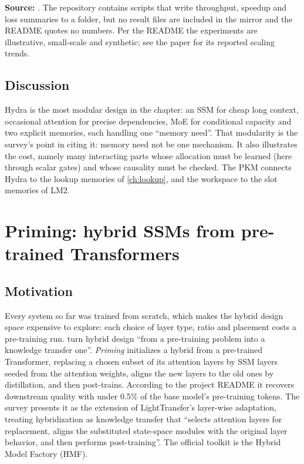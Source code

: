 \begin{results}
\textbf{Source:} . The repository contains scripts
that write throughput, speedup and loss summaries to a  folder, but no result files
are included in the mirror and the README quotes no numbers. Per the README the experiments are
illustrative, small-scale and synthetic; see the paper for its reported scaling trends.
\end{results}

\subsection{Discussion}

Hydra is the most modular design in the chapter: an SSM for cheap long context, occasional
attention for precise dependencies, MoE for conditional capacity and two explicit memories, each
handling one ``memory need''. That modularity is the survey's point in citing it: memory need not be
one mechanism. It also illustrates the cost, namely many interacting parts whose allocation must be
learned (here through scalar gates) and whose causality must be checked. The PKM connects Hydra to
the lookup memories of \cref{ch:lookup}, and the workspace to the slot memories of LM2.
\section{Priming: hybrid SSMs from pre-trained Transformers}\label{sec:c12-priming}

\subsection{Motivation}

Every system so far was trained from scratch, which makes the hybrid design space expensive to
explore: each choice of layer type, ratio and placement costs a pre-training run.
\citet{chattopadhyay2026priming} turn hybrid design ``from a pre-training problem into a
knowledge transfer one''. \emph{Priming} initializes a hybrid from a pre-trained Transformer,
replacing a chosen subset of its attention layers by SSM layers seeded from the attention weights,
aligns the new layers to the old ones by distillation, and then post-trains. According to the
project README it recovers downstream quality with under 0.5\% of the base model's pre-training
tokens. The survey presents it as the extension of LightTransfer's layer-wise adaptation, treating
hybridization as knowledge transfer that ``selects attention layers for replacement, aligns the
substituted state-space modules with the original layer behavior, and then performs
post-training''. The official toolkit is the Hybrid Model Factory (HMF).

